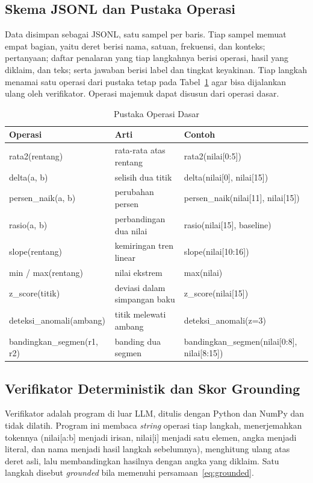 \documentclass[10pt,a4paper,twocolumn]{article}
\begin{document}
\subsection{Skema JSONL dan Pustaka Operasi}
Data disimpan sebagai JSONL, satu sampel per baris. Tiap sampel memuat empat
bagian, yaitu deret berisi nama, satuan, frekuensi, dan konteks; pertanyaan;
daftar penalaran yang tiap langkahnya berisi operasi, hasil yang diklaim, dan
teks; serta jawaban berisi label dan tingkat keyakinan. Tiap langkah menamai
satu operasi dari pustaka tetap pada Tabel~\ref{tab:operasi} agar bisa
dijalankan ulang oleh verifikator. Operasi majemuk dapat disusun dari operasi
dasar.

\begin{table}[t]
\centering
\caption{Pustaka Operasi Dasar}
\label{tab:operasi}
\footnotesize
\begin{tabular}{@{}>{\RaggedRight\arraybackslash}p{2.1cm}>{\RaggedRight\arraybackslash}p{2.2cm}>{\RaggedRight\arraybackslash}p{2.9cm}@{}}
\toprule
\textbf{Operasi} & \textbf{Arti} & \textbf{Contoh} \\
\midrule
rata2(rentang) & rata-rata atas rentang & rata2(nilai[0:5]) \\
delta(a, b) & selisih dua titik & delta(nilai[0], nilai[15]) \\
persen\_naik(a, b) & perubahan persen & persen\_naik(nilai[11], nilai[15]) \\
rasio(a, b) & perbandingan dua nilai & rasio(nilai[15], baseline) \\
slope(rentang) & kemiringan tren linear & slope(nilai[10:16]) \\
min / max(rentang) & nilai ekstrem & max(nilai) \\
z\_score(titik) & deviasi dalam simpangan baku & z\_score(nilai[15]) \\
deteksi\_\allowbreak anomali(ambang) & titik melewati ambang & deteksi\_\allowbreak anomali(z=3) \\
bandingkan\_\allowbreak segmen(r1, r2) & banding dua segmen & bandingkan\_\allowbreak segmen(\allowbreak nilai[0:8],\allowbreak{} nilai[8:15]) \\
\bottomrule
\end{tabular}
\end{table}

\subsection{Verifikator Deterministik dan Skor Grounding}
Verifikator adalah program di luar LLM, ditulis dengan Python dan NumPy dan
tidak dilatih. Program ini membaca \textit{string} operasi tiap langkah,
menerjemahkan tokennya (nilai[a:b] menjadi irisan, nilai[i] menjadi satu elemen,
angka menjadi literal, dan nama menjadi hasil langkah sebelumnya), menghitung
ulang atas deret asli, lalu membandingkan hasilnya dengan angka yang diklaim.
Satu langkah disebut \textit{grounded} bila memenuhi persamaan~\eqref{eq:grounded}.
\end{document}
